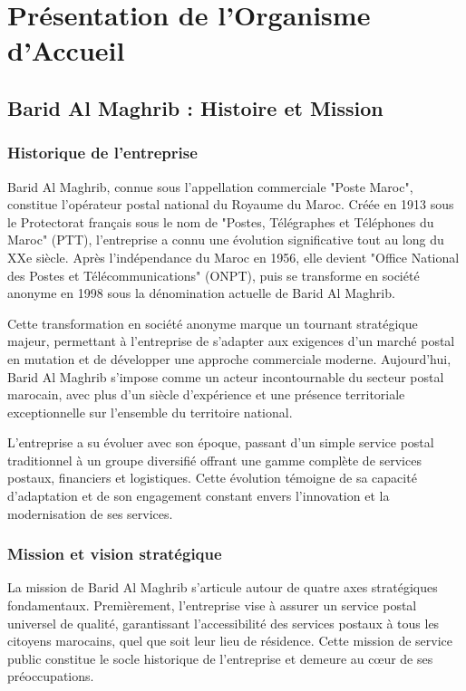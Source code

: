 \chapter{Présentation de l'Organisme d'Accueil}

\section{Barid Al Maghrib : Histoire et Mission}

\subsection{Historique de l'entreprise}

Barid Al Maghrib, connue sous l'appellation commerciale "Poste Maroc", constitue l'opérateur postal national du Royaume du Maroc. Créée en 1913 sous le Protectorat français sous le nom de "Postes, Télégraphes et Téléphones du Maroc" (PTT), l'entreprise a connu une évolution significative tout au long du XXe siècle. Après l'indépendance du Maroc en 1956, elle devient "Office National des Postes et Télécommunications" (ONPT), puis se transforme en société anonyme en 1998 sous la dénomination actuelle de Barid Al Maghrib.

Cette transformation en société anonyme marque un tournant stratégique majeur, permettant à l'entreprise de s'adapter aux exigences d'un marché postal en mutation et de développer une approche commerciale moderne. Aujourd'hui, Barid Al Maghrib s'impose comme un acteur incontournable du secteur postal marocain, avec plus d'un siècle d'expérience et une présence territoriale exceptionnelle sur l'ensemble du territoire national.

L'entreprise a su évoluer avec son époque, passant d'un simple service postal traditionnel à un groupe diversifié offrant une gamme complète de services postaux, financiers et logistiques. Cette évolution témoigne de sa capacité d'adaptation et de son engagement constant envers l'innovation et la modernisation de ses services.

\subsection{Mission et vision stratégique}

La mission de Barid Al Maghrib s'articule autour de quatre axes stratégiques fondamentaux. Premièrement, l'entreprise vise à assurer un service postal universel de qualité, garantissant l'accessibilité des services postaux à tous les citoyens marocains, quel que soit leur lieu de résidence. Cette mission de service public constitue le socle historique de l'entreprise et demeure au cœur de ses préoccupations.

